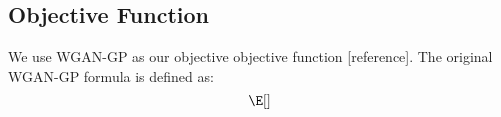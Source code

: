 \subsection{Objective Function}
We use WGAN-GP as our objective objective function [reference]. The original WGAN-GP formula is defined as:
\begin{equation}

\E[]
\end{equation}